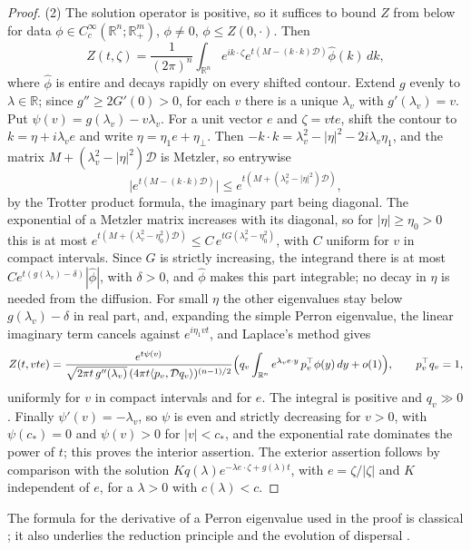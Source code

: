 \begin{proof}
(2) The solution operator is positive, so it suffices to bound $Z$ from below for data $\phi\in C_c^\infty(\mathbb R^n;\mathbb R_+^m)$, $\phi\ne0$, $\phi\le Z(0,\cdot)$. Then
\[
 Z(t,\zeta)=\frac1{(2\pi)^n}\int_{\mathbb R^n}e^{ik\cdot\zeta}e^{t(M-(k\cdot k)\mathcal D)}\hat\phi(k)\,dk ,
\]
where $\hat\phi$ is entire and decays rapidly on every shifted contour. Extend $g$ evenly to $\lambda\in\mathbb R$; since $g''\ge2G'(0)>0$, for each $v$ there is a unique $\lambda_v$ with $g'(\lambda_v)=v$. Put $\psi(v)=g(\lambda_v)-v\lambda_v$. For a unit vector $e$
and $\zeta=vte$, shift the contour to $k=\eta+i\lambda_ve$ and write $\eta=\eta_1e+\eta_\perp$. Then $-k\cdot k=\lambda_v^2-|\eta|^2-2i\lambda_v\eta_1$, and the matrix $M+(\lambda_v^2-|\eta|^2)\mathcal D$ is Metzler, so entrywise
\[
 \bigl|e^{t(M-(k\cdot k)\mathcal D)}\bigr|\le e^{t(M+(\lambda_v^2-|\eta|^2)\mathcal D)} ,
\]
by the Trotter product formula, the imaginary part being diagonal. The exponential of a Metzler matrix increases with its diagonal, so for $|\eta|\ge\eta_0>0$ this is at most $e^{t(M+(\lambda_v^2-\eta_0^2)\mathcal D)}\le C\,e^{tG(\lambda_v^2-\eta_0^2)}$, with $C$ uniform for $v$ in compact intervals. Since $G$ is strictly increasing, the integrand there is at most $Ce^{t(g(\lambda_v)-\delta)}|\hat\phi|$, with $\delta>0$, and $\hat\phi$ makes this part integrable; no decay in $\eta$ is needed from the diffusion. For small $\eta$ the other eigenvalues stay below $g(\lambda_v)-\delta$ in real part, and, expanding the
simple Perron eigenvalue, the linear imaginary term cancels against $e^{i\eta_1vt}$, and Laplace's method gives
\[
 Z(t,vte)=\frac{e^{t\psi(v)}}{\sqrt{2\pi t\,g''(\lambda_v)}\,(4\pi t\langle p_v,\mathcal Dq_v\rangle)^{(n-1)/2}}\Bigl(q_v\int_{\mathbb R^n}e^{\lambda_ve\cdot y}\,p_v^\top\phi(y)\,dy+o(1)\Bigr),\qquad p_v^\top q_v=1,
\]
uniformly for $v$ in compact intervals and for $e$. The integral is positive and $q_v\gg0$. Finally $\psi'(v)=-\lambda_v$, so $\psi$ is even and strictly decreasing for $v>0$, with $\psi(c_*)=0$ and $\psi(v)>0$ for $|v|<c_*$, and the exponential rate dominates the power of $t$;
this proves the interior assertion. The exterior assertion follows by comparison with the solution $Kq(\lambda)e^{-\lambda e\cdot\zeta+g(\lambda)t}$, with $e=\zeta/|\zeta|$ and $K$ independent of $e$, for a $\lambda>0$ with $c(\lambda)<c$.
\end{proof}
The formula for the derivative of a Perron eigenvalue used in the proof is classical \cite{Seneta,ElsnerJohnson,Nussbaum1986}; it also underlies the reduction principle and the evolution of dispersal \cite{Karlin1982,Altenberg2012,Dockery1998}.






